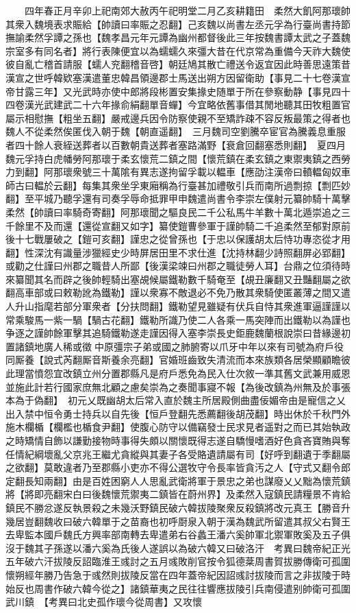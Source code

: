 　　四年春正月辛卯上祀南郊大赦丙午祀明堂二月乙亥耕籍田　柔然大飢阿那瓌帥其衆入魏境表求賑給【帥讀曰率賑之忍翻】己亥魏以尚書左丞元孚為行臺尚書持節撫諭柔然孚譚之孫也【魏孝昌元年元譚為幽州都督後此三年按魏書譚太武之子蓋魏宗室多有同名者】將行表陳便宜以為蠕蠕久來彊大昔在代京常為重備今天祚大魏使彼自亂亡稽首請服【蠕人兖翻稽音啓】朝廷鳩其散亡禮送令返宜因此時善思遠策昔漢宣之世呼韓欵塞漢遣董忠韓昌領邊郡士馬送出朔方因留衛助【事見二十七卷漢宣帝甘露三年】又光武時亦使中郎將段彬置安集掾史随單于所在參察動静【事見四十四卷漢光武建武二十六年掾俞絹翻單音蟬】今宜略依舊事借其閒地聽其田牧粗置官屬示相慰撫【粗坐五翻】嚴戒邊兵因令防察使親不至矯詐疎不容反叛最策之得者也魏人不從柔然俟匿伐入朝于魏【朝直遥翻】　三月魏司空劉騰卒宦官為騰義息重服者四十餘人衰絰送葬者以百數朝貴送葬者塞路滿野【衰倉回翻塞悉則翻】　夏四月魏元孚持白虎幡勞阿那瓌于柔玄懷荒二鎮之間【懷荒鎮在柔玄鎮之東禦夷鎮之西勞力到翻】阿那瓌衆號三十萬隂有異志遂拘留孚載以輼車【應劭注漢帝曰轒輼匈奴車師古曰輼於云翻】每集其衆坐孚東廂稱為行臺甚加禮敬引兵而南所過剽掠【剽匹妙翻】至平城乃聽孚還有司奏孚辱命抵罪甲申魏遣尚書令李崇左僕射元纂帥騎十萬擊柔然【帥讀曰率騎奇寄翻】阿那瓌聞之驅良民二千公私馬牛羊數十萬北遁崇追之三千餘里不及而還【還從宣翻又如字】纂使鎧曹參軍于謹帥騎二千追柔然至郁對原前後十七戰屢破之【鎧可亥翻】謹忠之從曾孫也【于忠以保護胡太后恃功專恣從才用翻】性深沈有識量涉獵經史少時屏居田里不求仕進【沈持林翻少詩照翻屏必郢翻】或勸之仕謹曰州郡之職昔人所鄙【後漢梁竦曰州郡之職徒勞人耳】台鼎之位須待時來纂聞其名而辟之後帥輕騎出塞覘候屬鐵勒數千騎奄至【覘丑廉翻又丑豔翻屬之欲翻高車部或曰敕勒訛為鐵勒】謹以衆寡不敵退必不免乃散其衆騎使匿叢薄之間又遣人升山指麾若部分軍衆者【分扶問翻】鐵勒望見雖疑有伏兵自恃其衆進軍逼謹謹以常乘駿馬一紫一騧【騧古花翻】鐵勒所識乃使二人各乘一馬突陣而出鐵勒以為謹也争逐之謹帥餘軍擊其追騎鐵勒遂走謹因得入塞李崇長史鉅鹿魏蘭根說崇曰昔緣邊初置諸鎮地廣人稀或徵中原彊宗子弟或國之肺腑寄以爪牙中年以來有司號為府戶役同厮養【說式芮翻厮音斯養余亮翻】官婚班齒致失清流而本來族類各居榮顯顧瞻彼此理當憤怨宜改鎮立州分置郡縣凡是府戶悉免為民入仕次敘一準其舊文武兼用威恩並施此計若行國家庶無北顧之慮矣崇為之奏聞事寢不報【為後改鎮為州無及於事張本為于偽翻】　初元乂既幽胡太后常入直於魏主所居殿側曲盡佞媚帝由是寵信之乂出入禁中恒令勇士持兵以自先後【恒戶登翻先悉薦翻後胡茂翻】時出休於千秋門外施木欄楯【欄檻也楯食尹翻】使腹心防守以備竊發士民求見者遥對之而已其始執政之時矯情自飾以謙勤接物時事得失頗以關懷既得志遂自驕慢嗜酒好色貪吝寶賄與奪任情紀綱壞亂父京兆王繼尤貪縱與其妻子各受賂遺請屬有司【好呼到翻遺于季翻屬之欲翻】莫敢違者乃至郡縣小吏亦不得公選牧守令長率皆貪汚之人【守式又翻令郎定翻長知兩翻】由是百姓困窮人人思亂武衛將軍于景忠之弟也謀廢乂乂黜為懷荒鎮將【將即亮翻宋白曰後魏懷荒禦夷二鎮皆在蔚州界】及柔然入寇鎮民請糧景不肯給鎮民不勝忿遂反執景殺之未幾沃野鎮民破六韓拔陵聚衆反殺鎮將改元真王【勝音升幾居豈翻魏收曰破六韓單于之苗裔也初呼㕑泉入朝于漢為魏武所留遣其叔父右賢王去卑監本國戶魏氏方興率部南轉去卑遣弟右谷蠡王潘六奚帥軍北禦軍敗奚及五子俱沒于魏其子孫遂以潘六奚為氏後人遂誤以為破六韓又曰破洛汗　考異曰魏帝紀正光五年破六汗拔陵反詔臨淮王彧討之五月彧敗削官按令狐德棻周書賀拔勝傳衛可孤圍懷朔經年勝乃告急于彧然則拔陵反當在四年蓋帝紀因詔彧討拔陵而言之非拔陵于時始反也周書作破六韓今從之】諸鎮華夷之民往往響應拔陵引兵南侵遣别帥衛可孤圍武川鎮　【考異曰北史孤作瓌今從周書】又攻懷